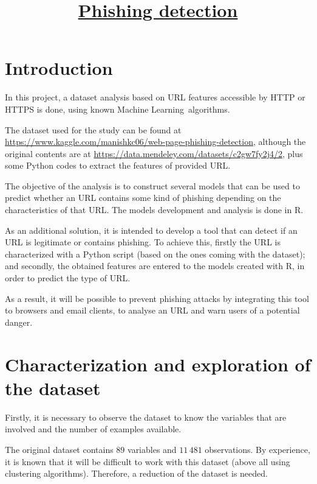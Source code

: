 \documentclass[12pt, a4paper]{article}
\title{\underline{\textbf{Phishing detection}}}
\author{\Author}
\date{\displaydate{date}}
\newcommand*{\ML}{Machine Learning}
\begin{document}
  \vspace{3cm}
  \maketitle

  \newpage
  \tableofcontents

  \newpage
  \listoffigures

  \newpage
  \section*{Introduction}

    In this project, a dataset analysis based on URL features accessible by HTTP or HTTPS is done, using known \ML\ algorithms.

    The dataset used for the study can be found at \url{https://www.kaggle.com/manishkc06/web-page-phishing-detection}, although the original contents are at \url{https://data.mendeley.com/datasets/c2gw7fy2j4/2}, plus some Python codes to extract the features of provided URL.

    The objective of the analysis is to construct several models that can be used to predict whether an URL contains some kind of phishing depending on the characteristics of that URL. The models development and analysis is done in R.

    As an additional solution, it is intended to develop a tool that can detect if an URL is legitimate or contains phishing. To achieve this, firstly the URL is characterized with a Python script (based on the ones coming with the dataset); and secondly, the obtained features are entered to the models created with R, in order to predict the type of URL.

    As a result, it will be possible to prevent phishing attacks by integrating this tool to browsers and email clients, to analyse an URL and warn users of a potential danger.

  \section{Characterization and exploration of the dataset}

    Firstly, it is necessary to observe the dataset to know the variables that are involved and the number of examples available.

    The original dataset contains $89$ variables and $11\,481$ observations. By experience, it is known that it will be difficult to work with this dataset (above all using clustering algorithms). Therefore, a reduction of the dataset is needed.
\end{document}
